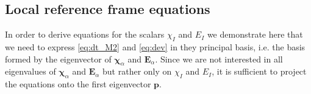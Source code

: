 


\subsection{Local reference frame equations}

In order to derive equations for the scalars $\chi_I$ and $E_I$ we demonstrate here that we need to express \ref{eq:dt_M2} and \ref{eq:dev} in they principal basis, i.e. the basis formed by the eigenvector of $\bm\chi_\alpha$ and $\textbf{E}_\alpha$. 
Since we are not interested in all eigenvalues of $\bm\chi_\alpha$ and $\textbf{E}_\alpha$ but rather only on $\chi_I$ and $E_I$, it is sufficient to project the equations onto the first eigenvector $\textbf{p}$. 

